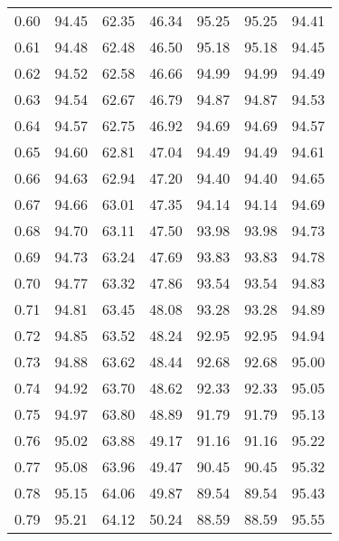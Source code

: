 \begin{tabular}{|c|c|c|c|c|c|c|}
      0.60 &     94.45 &     62.35 &      46.34 &   95.25 &      95.25 &         94.41 \\
      0.61 &     94.48 &     62.48 &      46.50 &   95.18 &      95.18 &         94.45 \\
      0.62 &     94.52 &     62.58 &      46.66 &   94.99 &      94.99 &         94.49 \\
      0.63 &     94.54 &     62.67 &      46.79 &   94.87 &      94.87 &         94.53 \\
      0.64 &     94.57 &     62.75 &      46.92 &   94.69 &      94.69 &         94.57 \\
      0.65 &     94.60 &     62.81 &      47.04 &   94.49 &      94.49 &         94.61 \\
      0.66 &     94.63 &     62.94 &      47.20 &   94.40 &      94.40 &         94.65 \\
      0.67 &     94.66 &     63.01 &      47.35 &   94.14 &      94.14 &         94.69 \\
      0.68 &     94.70 &     63.11 &      47.50 &   93.98 &      93.98 &         94.73 \\
      0.69 &     94.73 &     63.24 &      47.69 &   93.83 &      93.83 &         94.78 \\
      0.70 &     94.77 &     63.32 &      47.86 &   93.54 &      93.54 &         94.83 \\
      0.71 &     94.81 &     63.45 &      48.08 &   93.28 &      93.28 &         94.89 \\
      0.72 &     94.85 &     63.52 &      48.24 &   92.95 &      92.95 &         94.94 \\
      0.73 &     94.88 &     63.62 &      48.44 &   92.68 &      92.68 &         95.00 \\
      0.74 &     94.92 &     63.70 &      48.62 &   92.33 &      92.33 &         95.05 \\
      0.75 &     94.97 &     63.80 &      48.89 &   91.79 &      91.79 &         95.13 \\
      0.76 &     95.02 &     63.88 &      49.17 &   91.16 &      91.16 &         95.22 \\
      0.77 &     95.08 &     63.96 &      49.47 &   90.45 &      90.45 &         95.32 \\
      0.78 &     95.15 &     64.06 &      49.87 &   89.54 &      89.54 &         95.43 \\
      0.79 &     95.21 &     64.12 &      50.24 &   88.59 &      88.59 &         95.55 \\

\end{tabular}
